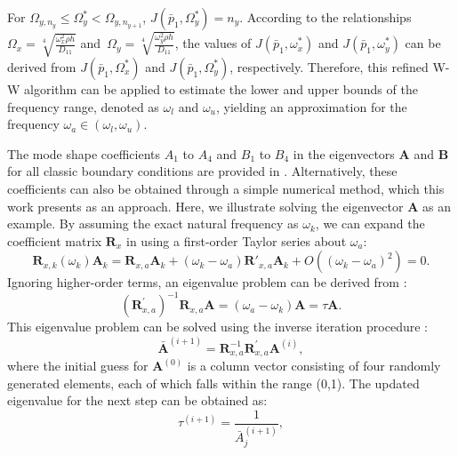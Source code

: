 \documentclass[preprint,12pt]{elsarticle}
\begin{document}
%
For \(\Omega_{y,n_y} \leq \Omega_y^* < \Omega_{y,n_{y+1}}\), \(J(\bar{p}_1, \Omega_y^*) = n_y\).
According to the relationships 
$\Omega_x = \sqrt[4]{\frac{\omega_x^2 \rho h}{D_{11}}}$ and\ $\Omega_y = \sqrt[4]{\frac{\omega_y^2 \rho h}{D_{11}}}$, 
the values of \(J(\bar{p}_1, \omega_x^*)\) and \(J(\bar{p}_1, \omega_y^*)\) can be derived from \(J(\bar{p}_1, \Omega_x^*)\) and \(J(\bar{p}_1, \Omega_y^*)\), respectively. Therefore, this refined W-W algorithm can be applied to estimate the lower and upper bounds of the frequency range, denoted as \(\omega_l\) and \(\omega_u\), yielding an approximation for the frequency \(\omega_a \in (\omega_l, \omega_u)\).

The mode shape coefficients \( A_1 \) to \( A_4 \) and \( B_1 \) to \( B_4 \) in the eigenvectors \( \mathbf{A} \) and \( \mathbf{B} \) for all classic boundary conditions are provided in \cite{xing2020extended}. 
Alternatively, these coefficients can also be obtained through a simple numerical method, which this work presents as an approach.
Here, we illustrate solving the eigenvector \( \mathbf{A} \) as an example.
By assuming the exact natural frequency as \( \omega_k \), we can expand the coefficient matrix \( \mathbf{R}_{x} \) in  using a first-order Taylor series about \( \omega_a \):
%
\begin{equation}\label{eq:Taylor}
	\mathbf{R}_{x,k}(\omega_k)\mathbf{A}_k = \mathbf{R}_{x,a}\mathbf{A}_k + (\omega_k - \omega_a)\mathbf{R}'_{x,a}\mathbf{A}_k + O\left((\omega_k - \omega_a)^2\right) = 0.
\end{equation}
%
Ignoring higher-order terms, an eigenvalue problem can be derived from :
%
\begin{equation}\label{eq:Newgeigen}
	(\mathbf{R}^{'}_{x,a})^{-1} \mathbf{R}_{x,a} \mathbf{A} = (\omega_a - \omega_k)\mathbf{A} = \tau \mathbf{A}.
\end{equation}
%
This eigenvalue problem can be solved using the inverse iteration procedure \cite{yuan2004second}:
%
\begin{equation}\label{eq:Inversepower}
	\bar{\mathbf{A}}^{(i+1)} = \mathbf{R}_{x,a}^{-1} \mathbf{R}^{'}_{x,a} \mathbf{A}^{(i)},	
\end{equation}
%
where the initial guess for \( \mathbf{A}^{(0)} \) is a column vector consisting of four randomly generated elements, each of which falls within the range (0,1). The updated eigenvalue for the next step can be obtained as:
%
\begin{equation}\label{eq:Newgeigenvalue}
	\tau^{(i+1)} = \frac{1}{\bar{A}_j^{(i+1)}},
\end{equation}
\end{document}
